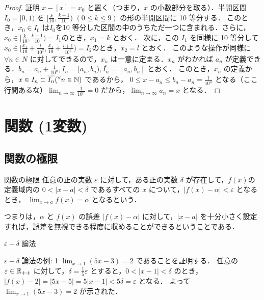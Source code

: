 \documentclass[a4paper]{ltjsarticle}
\begin{document}
  \begin{proof}{証明}{}
   $x - [x] = x_0$ と置く（つまり，$x$ の小数部分を取る）．半開区間 $I_0 = [0, 1)$ を $[\frac{k}{10},\frac{k + 1}{10})$ \hspace{10pt} $(0 \leq k \leq 9)$ の形の半開区間に 10 等分する．
   このとき，$x_0 \in I_0$ は$I_0$を10 等分した区間の中のうちただ一つに含まれる．さらに，$x_0 \in [\frac{k}{10}, \frac{k + 1}{10}) = I_1 のとき，x_1 = k$ とおく．
   次に，この $I_1$ を同様に 10 等分して $x_0 \in [\frac{x_1}{10} + \frac{l}{10^2}, \frac{x_1}{10} + \frac{l + 1}{10^2}) = I_2 のとき，x_2 = l$ とおく．
   このような操作が同様に $\forall n \in N$ に対してできるので，$x_n$ は一意に定まる．$x_n$ がわかれば $a_n$ が定義できる．$b_n = a_n + \frac{1}{10^n}, I_n = [a_n, b_n), \overline{I_n} = [a_n, b_n]$ とおく．
   このとき，$x_n$ の定義から，$x \in I_n \subset \overline{I_n} (\forall n \in \N)$ であるから，
   $0 \leq x - a_n \leq b_n - a_n = \frac{1}{10^n}$ となる（ここ行間あるな）$\displaystyle \lim_{n \to \infty} \frac{1}{10^n} = 0$ だから，$\displaystyle \lim_{n \to \infty} a_n = x$ となる．
  \end{proof}

 \section{関数 (1変数)}
  \subsection{関数の極限}
  \begin{tcb}{関数の極限}{}
    任意の正の実数 $\varepsilon$ に対して，ある正の実数 $\delta$ が存在して，$f(x)$の定義域内の $0 < |x-a| < \delta$ であるすべての $x$ について，$|f(x) - \alpha| < \varepsilon$ となるとき，
    $\displaystyle \lim_{x \to a} f(x) = \alpha$ となるという．
  \end{tcb}
  つまりは，$\alpha$ と $f(x)$ の誤差 $|f(x) - \alpha|$ に対して，$|x-a|$ を十分小さく設定すれば，誤差を無視できる程度に収めることができるということである．

  \begin{tcb}{$\varepsilon-\delta$ 論法}{}
    
  \end{tcb}

  \begin{tcb}{$\varepsilon - \delta$ 論法の例: 1}{}
    $\displaystyle \lim_{x \to 1} (5x-3) = 2$ であることを証明する．
    任意の $\varepsilon \in \mathbb{R}_{++}$ に対して，$\delta = \frac{1}{5}\varepsilon$ とすると，$0 < |x - 1| < \delta$ のとき，$|f(x) - 2| = |5x-5| = 5|x-1| < 5\delta = \varepsilon$ となる．
    よって $\displaystyle \lim_{x \to 1} (5x-3) = 2$ が示された．
    
  \end{tcb}
\end{document}
